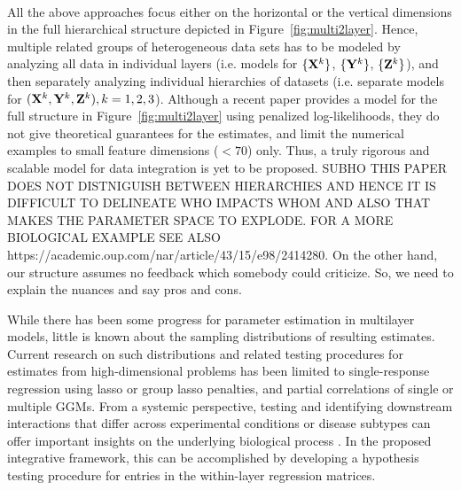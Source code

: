 \paragraph{}
All the above approaches focus either on the horizontal or the vertical dimensions in the full hierarchical structure depicted in Figure~\ref{fig:multi2layer}. Hence, multiple related groups of heterogeneous data sets has to be modeled by analyzing all data in individual layers (i.e. models for $\{ {\mathbf{X}}^k \}$, $\{ {\mathbf{Y}}^k \}$, $\{ {\mathbf{Z}}^k \}$), and then separately analyzing individual hierarchies of datasets (i.e. separate models for $({\mathbf{X}}^k, {\mathbf{Y}}^k, {\mathbf{Z}}^k), k = 1,2,3$). Although a recent paper \citep{ZhangOuyangZhao17} provides a model for the full structure in Figure~\ref{fig:multi2layer} using penalized log-likelihoods, they do not give theoretical guarantees for the estimates, and limit the numerical examples to small feature dimensions ($<70$) only. Thus, a truly rigorous and scalable model for data integration is yet to be proposed. SUBHO THIS PAPER DOES NOT DISTNIGUISH BETWEEN HIERARCHIES AND HENCE IT IS DIFFICULT TO DELINEATE WHO IMPACTS WHOM AND
ALSO THAT MAKES THE PARAMETER SPACE TO EXPLODE. FOR A MORE BIOLOGICAL EXAMPLE SEE ALSO https://academic.oup.com/nar/article/43/15/e98/2414280. On the other hand, our structure assumes no feedback which somebody could criticize.
So, we need to explain the nuances and say pros and cons.

While there has been some progress for parameter estimation in multilayer models, little is known about the sampling distributions of resulting estimates. Current research on such distributions and related testing procedures for estimates from high-dimensional problems has been limited to single-response regression using lasso \citep{ZhangZhang14,JavanmardMontanari14,JavanmardMontanari18,vanDeGeerEtal14} or group lasso \citep{MitraZhang16} penalties, and partial correlations of single \citep{CaiLiu16} or multiple \citep{BelilovskyEtal16,Liu17} GGMs. From a systemic perspective, testing and identifying downstream interactions that differ across experimental conditions or disease subtypes can offer important insights on the underlying biological process \citep{MaoEtal17,LiEtal15}. In the proposed integrative framework, this can be accomplished by developing a hypothesis testing procedure for entries in the within-layer regression matrices.

